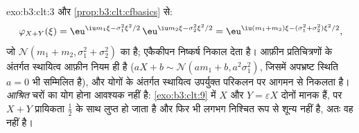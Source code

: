 \begin{solution}{exo:b3:clt:3}
 और \cref{prop:b3:clt:cfbasics} से:
\[
\varphi_{X+Y}(\xi) = \eu^{\iu m_1\xi - \sigma_1^2\xi^2/2}\,
\eu^{\iu m_2\xi - \sigma_2^2\xi^2/2}
= \eu^{\iu(m_1+m_2)\xi - (\sigma_1^2+\sigma_2^2)\xi^2/2},
\]
जो $\mathcal N(m_1 + m_2, \sigma_1^2 + \sigma_2^2)$ का
 है; एकैकीपन निष्कर्ष निकाल देता है। आफ़ीन
प्रतिचित्रणों के अंतर्गत स्थायित्व आफ़ीन नियम ही है ($aX + b
\sim \mathcal N(am_1 + b, a^2\sigma_1^2)$, जिसमें अपभ्रष्ट
स्थिति $a = 0$ भी सम्मिलित है), और  योगों के अंतर्गत
स्थायित्व उपर्युक्त परिकलन पर आगमन से निकलता है।
\emph{आश्रित}  चरों का योग  होना आवश्यक नहीं है:
\cref{exo:b3:clt:9} में $X$ और $Y = \varepsilon X$ दोनों
मानक  हैं, पर $X + Y$ प्रायिकता $\frac12$ के साथ लुप्त
हो जाता है और फिर भी लगभग निश्चित रूप से शून्य नहीं है, अतः
वह  नहीं है।
\end{solution}

